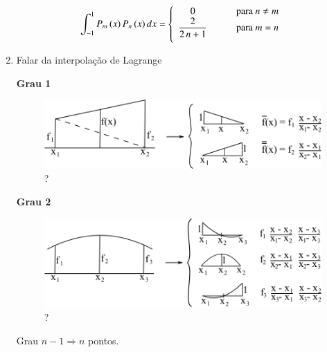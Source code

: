 \begin{enumerate}
\[
 \int_{-1}^1 P_m\,(x) \, P_n\,(x)\,dx =
 \left\{
 \begin{array}{cl}
  0                & \qquad \mbox{para $n \neq m$} \\ \vspace*{0.2cm}
  \displaystyle \frac{2}{2\,n+1} & \qquad \mbox{para $m = n$}
 \end{array}
 \right.
\]

\item
Falar da interpolação de Lagrange

\textbf{Grau 1}

\begin{figure}[htb]
 \centering
 \includegraphics[scale=1.0]{capitulos/capitulo2/figuras/roteiro_da_aula5.png}
 \caption{?}
 \label{fig:roteiro_da_aula5}
\end{figure}

\textbf{Grau 2}

\begin{figure}[htb]
 \centering
 \includegraphics[scale=1.0]{capitulos/capitulo2/figuras/roteiro_da_aula6.png}
 \caption{?}
 \label{fig:roteiro_da_aula6}
\end{figure}

Grau $n-1 \Rightarrow n$ pontos.

\end{enumerate}
